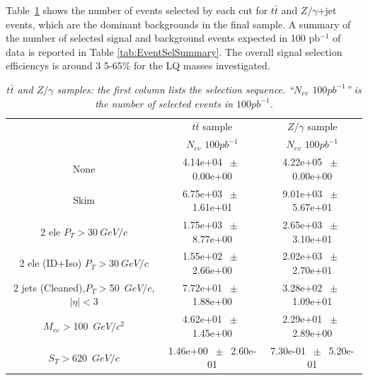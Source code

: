 \documentclass{cmspaper}
\begin{document}
\begin{linenumbers}
 
Table~\ref{tab:selection_effic_ttbar} shows the number of events selected by each cut 
for $t\bar{t}$ and $Z/\gamma$+jet events, which are the dominant backgrounds in the final sample. 
A summary of the number of selected signal and background events expected in 100 pb$^{-1}$ of data 
is reported in Table \ref{tab:EventSelSummary}. 
The overall signal selection efficiencys is around 3
5-65\% for the LQ masses investigated. 


\begin{table}[htbp]
\begin{center}
\begin{tabular}{|c| |c|c|}
\hline
\hline
 & $t\bar{t}$ sample  & $Z/\gamma$ sample\\
 & $N_{ev}$ $100pb^{-1}$ & $N_{ev}$ $100pb^{-1}$ \\
  
\hline
\hline
None       &        4.14e+04       $~\pm~$       0.00e+00  &        4.22e+05       $~\pm~$       0.00e+00           \\       
Skim       &        6.75e+03       $~\pm~$       1.61e+01 &        9.01e+03       $~\pm~$       5.67e+01       \\       
2 ele $P_T>30~$$GeV/c$ &        1.75e+03       $~\pm~$       8.77e+00&        2.65e+03       $~\pm~$       3.10e+01     \\       
2 ele (ID+Iso) $P_T>30~$$GeV/c$ &        1.55e+02       $~\pm~$       2.66e+00 &        2.02e+03       $~\pm~$       2.70e+01     \\       
2 jets (Cleaned),$P_T>$50~$GeV/c$,$|\eta|<$3 &        7.72e+01       $~\pm~$       1.88e+00 &        3.28e+02       $~\pm~$       1.09e+01        \\       
$M_{ee}>$100~$GeV/c^2$ &        4.62e+01       $~\pm~$       1.45e+00 &        2.29e+01       $~\pm~$       2.89e+00        \\       
$S_T>$620~$GeV/c$ &        1.46e+00       $~\pm~$       2.60e-01 &        7.30e-01  $~\pm~$       5.20e-01        \\       
\hline
\end{tabular}
\end{center}
\caption{\small \sl $t\bar{t}$ and $Z/\gamma$ samples: the first column lists the selection sequence. ``$N_{ev}$  $100pb^{-1}$'' is the number of selected events in $100pb^{-1}$.}
\label{tab:selection_effic_ttbar}
\end{table}



\end{linenumbers}
\end{document}
